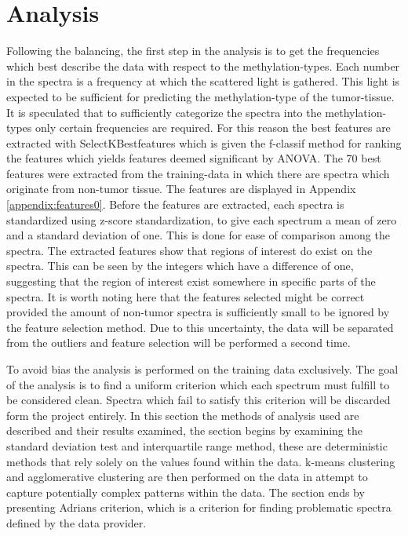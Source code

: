\section{Analysis}

Following the balancing, the first step in the analysis is to get the frequencies which best describe the data with respect to the methylation-types. Each number in the spectra is a frequency at which the scattered light is gathered. This light is expected to be sufficient for predicting the methylation-type of the tumor-tissue. It is speculated that to sufficiently categorize the spectra into the methylation-types only certain frequencies are required. For this reason the best features are extracted with SelectKBestfeatures \cite{scikit} which is given the f-classif method for ranking the features which yields features deemed significant by ANOVA. The 70 best features were extracted from the training-data in which there are spectra which originate from non-tumor tissue. The features are displayed in Appendix \ref{appendix:features0}. Before the features are extracted, each spectra is standardized using z-score standardization, to give each spectrum a mean of zero and a standard deviation of one. This is done for ease of comparison among the spectra. The extracted features show that regions of interest do exist on the spectra. This can be seen by the integers which have a difference of one, suggesting that the region of interest exist somewhere in specific parts of the spectra. It is worth noting here that the features selected might be correct provided the amount of non-tumor spectra is sufficiently small to be ignored by the feature selection method. Due to this uncertainty, the data will be separated from the outliers and feature selection will be performed a second time.

To avoid bias the analysis is performed on the training data exclusively. The goal of the analysis is to find a uniform criterion which each spectrum must fulfill to be considered clean. Spectra which fail to satisfy this criterion will be discarded form the project entirely. In this section the methods of analysis used are described and their results examined, the section begins by examining the standard deviation test and interquartile range method, these are deterministic methods that rely solely on the values found within the data. k-means clustering and agglomerative clustering are then performed on the data in attempt to capture potentially complex patterns within the data. The section ends by presenting Adrians criterion, which is a criterion for finding problematic spectra defined by the data provider. 

